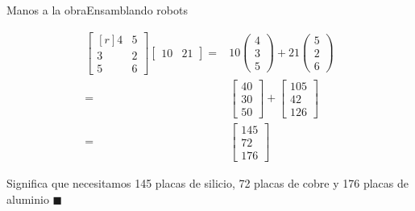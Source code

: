 \documentclass[spanish, c]{beamer}
\begin{document}
\begin{frame}{Manos a la obra}{Ensamblando robots}

    \begin{align*}
        \begin{bmatrix*}[r]
            4 & 5 \\
            3 & 2 \\
            5 & 6
        \end{bmatrix*}
        \begin{bmatrix} 10 & 21\end{bmatrix} = &
        10 %
        \begin{pmatrix}
            4 \\ 3 \\ 5
        \end{pmatrix}
        + 21 %
        \begin{pmatrix}
            5 \\ 2 \\ 6
        \end{pmatrix} \\[2ex]
        = & \begin{bmatrix} 40 \\ 30 \\ 50 \end{bmatrix} + \begin{bmatrix} 105 \\ 42 \\ 126 \end{bmatrix} \\[2ex]
        = & \begin{bmatrix} 145 \\ 72 \\ 176 \end{bmatrix}
    \end{align*}

    Significa que necesitamos 145 placas de silicio, 72 placas de cobre y 176 placas de aluminio $\blacksquare$

\end{frame}
\end{document}
